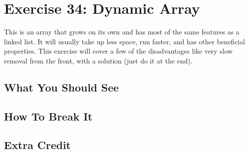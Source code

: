 \chapter{Exercise 34: Dynamic Array}

This is an array that grows on its own and has most of the same features as a linked
list.  It will usually take up less space, run faster, and has other beneficial properties.
This exercise will cover a few of the disadvantages like very slow removal from the front,
with a solution (just do it at the end).

\section{What You Should See}


\section{How To Break It}


\section{Extra Credit}




